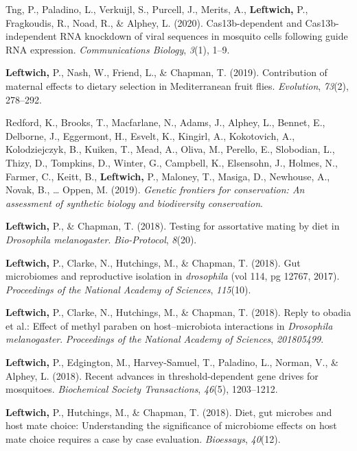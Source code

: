 \documentclass[11pt, a4paper]{awesome-cv}
\begin{document}
\leavevmode\hypertarget{ref-16}{}%
Tng, P., Paladino, L., Verkuijl, S., Purcell, J., Merits, A.,
\textbf{Leftwich,} P., Fragkoudis, R., Noad, R., \& Alphey, L. (2020).
Cas13b-dependent and {Cas}13b-independent {RNA} knockdown of viral
sequences in mosquito cells following guide {RNA} expression.
\emph{Communications Biology}, \emph{3}(1), 1--9.

\leavevmode\hypertarget{ref-15}{}%
\textbf{Leftwich,} P., Nash, W., Friend, L., \& Chapman, T. (2019).
Contribution of maternal effects to dietary selection in {Mediterranean}
fruit flies. \emph{Evolution}, \emph{73}(2), 278--292.

\leavevmode\hypertarget{ref-6}{}%
Redford, K., Brooks, T., Macfarlane, N., Adams, J., Alphey, L., Bennet,
E., Delborne, J., Eggermont, H., Esvelt, K., Kingirl, A., Kokotovich,
A., Kolodziejczyk, B., Kuiken, T., Mead, A., Oliva, M., Perello, E.,
Slobodian, L., Thizy, D., Tompkins, D., Winter, G., Campbell, K.,
Elsensohn, J., Holmes, N., Farmer, C., Keitt, B., \textbf{Leftwich,} P.,
Maloney, T., Masiga, D., Newhouse, A., Novak, B., \ldots{} Oppen, M.
(2019). \emph{Genetic frontiers for conservation: An assessment of
synthetic biology and biodiversity conservation}.

\leavevmode\hypertarget{ref-17}{}%
\textbf{Leftwich,} P., \& Chapman, T. (2018). Testing for assortative
mating by diet in \emph{{Drosophila} melanogaster}. \emph{Bio-Protocol},
\emph{8}(20).

\leavevmode\hypertarget{ref-3}{}%
\textbf{Leftwich,} P., Clarke, N., Hutchings, M., \& Chapman, T. (2018).
Gut microbiomes and reproductive isolation in \emph{drosophila} (vol
114, pg 12767, 2017). \emph{Proceedings of the National Academy of
Sciences}, \emph{115}(10).

\leavevmode\hypertarget{ref-10}{}%
\textbf{Leftwich,} P., Clarke, N., Hutchings, M., \& Chapman, T. (2018).
Reply to obadia et al.: Effect of methyl paraben on host--microbiota
interactions in \emph{{Drosophila} melanogaster}. \emph{Proceedings of
the National Academy of Sciences}, \emph{201805499}.

\leavevmode\hypertarget{ref-5}{}%
\textbf{Leftwich,} P., Edgington, M., Harvey-Samuel, T., Paladino, L.,
Norman, V., \& Alphey, L. (2018). Recent advances in threshold-dependent
gene drives for mosquitoes. \emph{Biochemical Society Transactions},
\emph{46}(5), 1203--1212.

\leavevmode\hypertarget{ref-12}{}%
\textbf{Leftwich,} P., Hutchings, M., \& Chapman, T. (2018). Diet, gut
microbes and host mate choice: Understanding the significance of
microbiome effects on host mate choice requires a case by case
evaluation. \emph{Bioessays}, \emph{40}(12).
\end{document}
